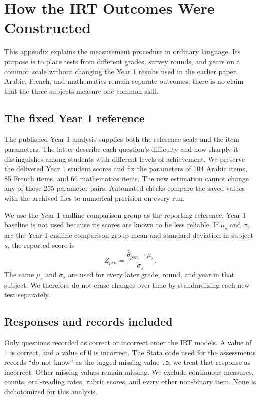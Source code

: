 \section{How the IRT Outcomes Were Constructed}
\label{app:irt}

This appendix explains the measurement procedure in ordinary language. Its
purpose is to place tests from different grades, survey rounds, and years on a
common scale without changing the Year 1 results used in the earlier paper.
Arabic, French, and mathematics remain separate outcomes; there is no claim
that the three subjects measure one common skill.

\subsection{The fixed Year 1 reference}

The published Year 1 analysis supplies both the reference scale and the item
parameters. The latter describe each question's difficulty and how sharply it
distinguishes among students with different levels of achievement. We preserve
the delivered Year 1 student scores and fix the parameters of 104 Arabic items,
85 French items, and 66 mathematics items. The new estimation cannot change
any of those 255 parameter pairs. Automated checks compare the saved values
with the archived files to numerical precision on every run.

We use the Year 1 endline comparison group as the reporting reference. Year 1
baseline is not used because its scores are known to be less reliable. If
\(\mu_s\) and \(\sigma_s\) are the Year 1 endline comparison-group mean and
standard deviation in subject \(s\), the reported score is
\[
 Z_{psn}=\frac{\widehat\theta_{psn}-\mu_s}{\sigma_s}.
\]
The same \(\mu_s\) and \(\sigma_s\) are used for every later grade, round, and
year in that subject. We therefore do not erase changes over time by
standardizing each new test separately.

\subsection{Responses and records included}

Only questions recorded as correct or incorrect enter the IRT models. A value
of 1 is correct, and a value of 0 is incorrect. The Stata code used for the
assessments records ``do not know'' as the tagged missing value \texttt{.a}; we
treat that response as incorrect. Other missing values remain missing. We
exclude continuous measures, counts, oral-reading rates, rubric scores, and
every other non-binary item. None is dichotomized for this analysis.

